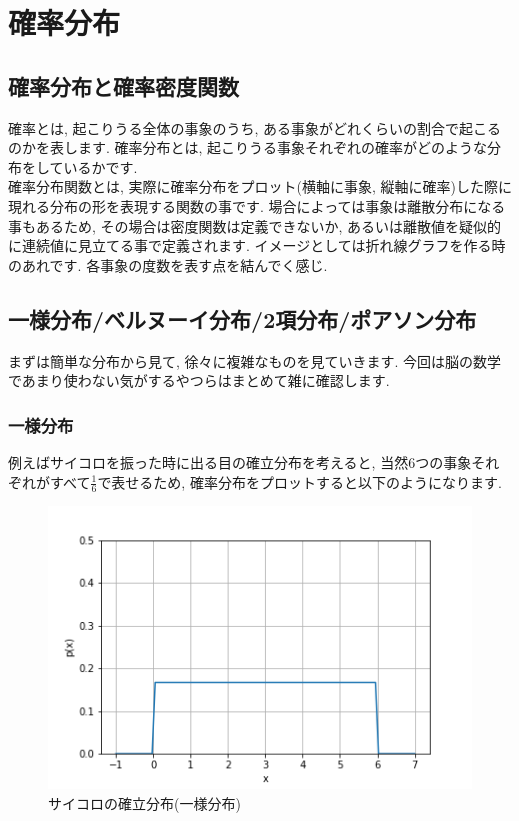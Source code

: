 \documentclass[11pt,a4paper,uplatex]{ujreport} 	%
\begin{document}
\section{確率分布}
\subsection{確率分布と確率密度関数}
確率とは, 起こりうる全体の事象のうち, ある事象がどれくらいの割合で起こるのかを表します. 確率分布とは, 起こりうる事象それぞれの確率がどのような分布をしているかです. \\
確率分布関数とは, 実際に確率分布をプロット(横軸に事象, 縦軸に確率)した際に現れる分布の形を表現する関数の事です. 場合によっては事象は離散分布になる事もあるため, その場合は密度関数は定義できないか, あるいは離散値を疑似的に連続値に見立てる事で定義されます. イメージとしては折れ線グラフを作る時のあれです. 各事象の度数を表す点を結んでく感じ.\\

\subsection{一様分布/ベルヌーイ分布/2項分布/ポアソン分布}
まずは簡単な分布から見て, 徐々に複雑なものを見ていきます. 今回は脳の数学であまり使わない気がするやつらはまとめて雑に確認します.\\
\subsubsection{一様分布}
例えばサイコロを振った時に出る目の確立分布を考えると, 当然6つの事象それぞれがすべて$\frac{1}{6}$で表せるため, 確率分布をプロットすると以下のようになります.\\
\begin{figure}[H]
\label{im:uniform}
  \centering
  \includegraphics[width=120mm,bb=0 0 432 288]{figures/uniform.png}
  \caption{サイコロの確立分布(一様分布)}
\end{figure}
\end{document}
